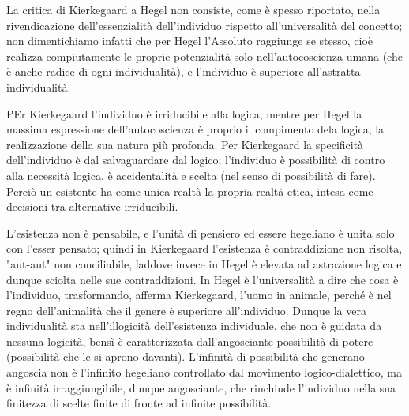 La critica di Kierkegaard a Hegel non consiste, come è spesso riportato, nella rivendicazione dell'essenzialità dell'individuo rispetto all'universalità del concetto; non dimentichiamo infatti che per Hegel l'Assoluto raggiunge se stesso, cioè realizza compiutamente le proprie potenzialità solo nell'autocoscienza umana (che è anche radice di ogni individualità), e l'individuo è superiore all'astratta individualità.

 PEr Kierkegaard l'individuo è irriducibile alla logica, mentre per Hegel la massima espressione dell'autocoscienza è proprio il compimento dela logica, la realizzazione della sua natura più profonda. Per Kierkegaard la specificità dell'individuo è dal salvaguardare dal logico; l'individuo è possibilità di contro alla necessità logica, è accidentalità e scelta (nel senso di possibilità di fare). Perciò un esistente ha come unica realtà la propria realtà etica, intesa come decisioni tra alternative irriducibili. 
 
 L'esistenza non è pensabile, e l'unità di pensiero ed essere hegeliano è unita solo con l'esser pensato; quindi in Kierkegaard l'esistenza è contraddizione non risolta, "aut-aut" non conciliabile, laddove invece in Hegel è elevata ad astrazione logica e dunque sciolta nelle sue contraddizioni. In Hegel è l'universalità  a dire che cosa è l'individuo, trasformando, afferma Kierkegaard, l'uomo in animale, perché è nel regno dell'animalità che il genere è superiore all'individuo. Dunque la vera individualità sta nell'illogicità dell'esistenza individuale, che non è guidata da nessuna logicità, bensì è caratterizzata dall'angosciante possibilità di potere (possibilità che le si aprono davanti). L'infinità di possibilità che generano angoscia non è l'infinito hegeliano controllato dal movimento logico-dialettico, ma è infinità irraggiungibile, dunque angosciante, che rinchiude l'individuo nella sua finitezza di scelte finite di fronte ad infinite possibilità.